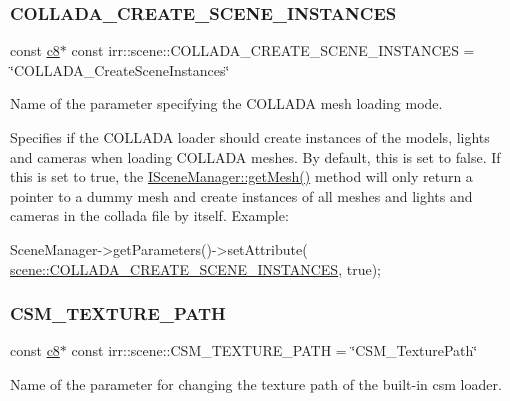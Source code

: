 \subsubsection{\texorpdfstring{C\+O\+L\+L\+A\+D\+A\+\_\+\+C\+R\+E\+A\+T\+E\+\_\+\+S\+C\+E\+N\+E\+\_\+\+I\+N\+S\+T\+A\+N\+C\+ES}{COLLADA\_CREATE\_SCENE\_INSTANCES}}
{\footnotesize\ttfamily const \hyperlink{namespaceirr_a9395eaea339bcb546b319e9c96bf7410}{c8}$\ast$ const irr\+::scene\+::\+C\+O\+L\+L\+A\+D\+A\+\_\+\+C\+R\+E\+A\+T\+E\+\_\+\+S\+C\+E\+N\+E\+\_\+\+I\+N\+S\+T\+A\+N\+C\+ES = \char`\"{}C\+O\+L\+L\+A\+D\+A\+\_\+\+Create\+Scene\+Instances\char`\"{}}



Name of the parameter specifying the C\+O\+L\+L\+A\+DA mesh loading mode. 

Specifies if the C\+O\+L\+L\+A\+DA loader should create instances of the models, lights and cameras when loading C\+O\+L\+L\+A\+DA meshes. By default, this is set to false. If this is set to true, the \hyperlink{classirr_1_1scene_1_1ISceneManager_a63894c3f3d46cfc385116f1705935e03}{I\+Scene\+Manager\+::get\+Mesh()} method will only return a pointer to a dummy mesh and create instances of all meshes and lights and cameras in the collada file by itself. Example\+: 
\begin{DoxyCode}
SceneManager->getParameters()->setAttribute(
      \hyperlink{namespaceirr_1_1scene_a157681b3ef101a801ce278e6f21de946}{scene::COLLADA\_CREATE\_SCENE\_INSTANCES}, \textcolor{keyword}{true});
\end{DoxyCode}
 \mbox{\label{namespaceirr_1_1scene_aecf002b9e14bd101b455632e1c260a8d}} 
\subsubsection{\texorpdfstring{C\+S\+M\+\_\+\+T\+E\+X\+T\+U\+R\+E\+\_\+\+P\+A\+TH}{CSM\_TEXTURE\_PATH}}
{\footnotesize\ttfamily const \hyperlink{namespaceirr_a9395eaea339bcb546b319e9c96bf7410}{c8}$\ast$ const irr\+::scene\+::\+C\+S\+M\+\_\+\+T\+E\+X\+T\+U\+R\+E\+\_\+\+P\+A\+TH = \char`\"{}C\+S\+M\+\_\+\+Texture\+Path\char`\"{}}



Name of the parameter for changing the texture path of the built-\/in csm loader. 

